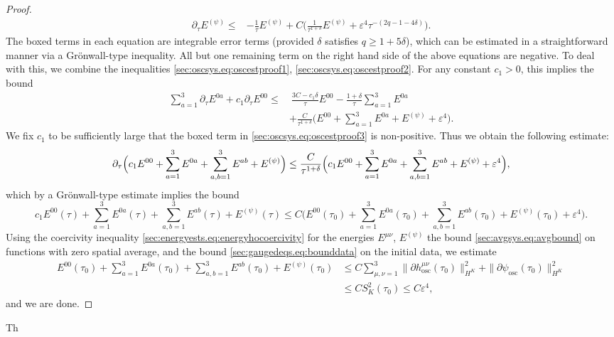 \documentclass{article}
\newcommand{\osc}{\mathrm{osc}}
\newcommand{\ve}{\varepsilon}
\newcommand{\pa}{\partial}
\begin{document}
\begin{proof}
\begin{subequations}
\begin{align}
            \pa_\tau E^{(\psi)}\leq &-\frac{1}{\tau}E^{(\psi)} + \boxed{C\Big(\frac{1}{\tau^{1+\delta}}E^{(\psi)} + \ve^4\tau^{-(2q-1-4\delta)}\Big)}.
        \end{align}
    \end{subequations}
    The boxed terms in each equation are integrable error terms (provided $\delta$ satisfies $q \geq 1+5\delta$), which can be estimated in a straightforward manner via a Gr\"onwall-type inequality. All but one remaining term on the right hand side of the above equations are negative. To deal with this, we combine the inequalities \eqref{sec:oscsys.eq:oscestproof1}, \eqref{sec:oscsys.eq:oscestproof2}. For any constant $c_1 > 0$, this implies the bound
    \begin{align}
         \sum_{a=1}^3\pa_\tau E^{0a} + c_1\pa_\tau E^{00} \leq&\> \boxed{\frac{3C-c_1\delta}{\tau}E^{00}} -\frac{1+\delta}{\tau}\sum_{a=1}^3E^{0a}\nonumber\\
        &+\frac{C}{\tau^{1+\delta}}\Big(E^{00}+\sum_{a=1}^3 E^{0a} + E^{(\psi)} + \ve^4\Big).\label{sec:oscsys.eq:oscestproof3}
    \end{align}
    We fix $c_1$ to be sufficiently large that the boxed term in \eqref{sec:oscsys.eq:oscestproof3} is non-positive. Thus we obtain the following estimate:
    \begin{equation}
        \pa_\tau \Big(c_1E^{00} + \sum_{a=1}^3 E^{0a} + \sum_{a,b=1}^3E^{ab} + E^{(\psi)}\Big)\\
        \leq \frac{C}{\tau^{1+\delta}}\Big(c_1 E^{00} + \sum_{a=1}^3 E^{0a} + \sum_{a,b=1}^3E^{ab} + E^{(\psi)} + \ve^4\Big),
    \end{equation}
    which by a Gr\"onwall-type estimate implies the bound
    \begin{equation}
        c_1E^{00}(\tau) + \sum_{a=1}^3 E^{0a}(\tau) + \sum_{a,b=1}^3E^{ab}(\tau) + E^{(\psi)}(\tau)
        \leq C\Big(E^{00}(\tau_0) + \sum_{a=1}^3 E^{0a}(\tau_0) + \sum_{a,b=1}^3E^{ab}(\tau_0) + E^{(\psi)}(\tau_0) + \ve^4\Big).
    \end{equation}
    Using the coercivity inequality \eqref{sec:energyests.eq:energyhocoercivity} for the energies $E^{\mu\nu}$, $E^{(\psi)}$ the bound \eqref{sec:avgsys.eq:avgbound} on functions with zero spatial average, and the bound \eqref{sec:gaugedeqs.eq:bounddata} on the initial data, we estimate
    \begin{align}
        E^{00}(\tau_0) + \sum_{a=1}^3 E^{0a}(\tau_0) + \sum_{a,b=1}^3E^{ab}(\tau_0) + E^{(\psi)}(\tau_0) &\leq C\sum_{\mu,\nu=1}^3\|\pa h_{\osc}^{\mu\nu}(\tau_0)\|_{H^K}^2  + \|\pa \psi_\osc(\tau_0)\|_{H^K}^2 \nonumber\\&\leq CS_K^2(\tau_0)\leq C\ve^4,
    \end{align}
    and we are done.
\end{proof}
\begin{remark}
    Th
\end{remark}
\end{document}
